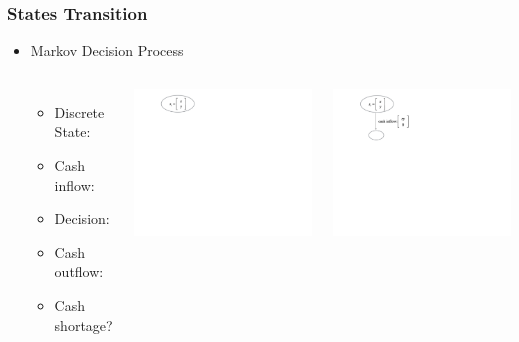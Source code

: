 \documentclass{beamer}
\begin{document}
\begin{frame}
\frametitle{States Transition}
\begin{itemize}
\item Markov Decision Process
\begin{columns}


\begin{itemize}

\item<1-> Discrete State:

\item<2-> Cash inflow: 



\item<3-> Decision:

\item<4-> Cash outflow:

\item<5-> Cash shortage?

\end{itemize}


 {\includegraphics[scale=0.35]{mdp1}}


 {\includegraphics[scale=0.35]{mdp2}}


\end{columns}
\end{itemize}
\end{frame}
\end{document}
